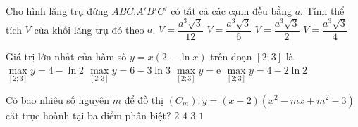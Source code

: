 \begin{ex}%
Cho hình lăng trụ đứng $ABC.A'B'C'$ có tất cả các cạnh đều bằng $a$. Tính thể tích $V$ của khối lăng trụ đó theo $a$.
\choice
{$V=\dfrac{a^3\sqrt3}{12}$}
{$V=\dfrac{a^3\sqrt3}{6}$}
{$V=\dfrac{a^3\sqrt3}{2}$}
{\True $V=\dfrac{a^3\sqrt3}{4}$}
\end{ex}

\begin{ex}%
Giá trị lớn nhất của hàm số $y=x(2-\ln x)$ trên đoạn $[2;3]$ là
\choice
{$\max\limits_{[2;3]}y=4-\ln2$}
{$\max\limits_{[2;3]}y=6-3\ln3$}
{\True $\max\limits_{[2;3]}y=\mathrm{e}$}
{$\max\limits_{[2;3]}y=4-2\ln2$}
\end{ex}

\begin{ex}%
Có bao nhiêu số nguyên $m$ để đồ thị $(C_m):y=(x-2)(x^2-mx+m^2-3)$ cắt trục hoành tại ba điểm phân biệt?
\choice
{\True $2$}
{$4$}
{$3$}
{$1$}
\end{ex}

